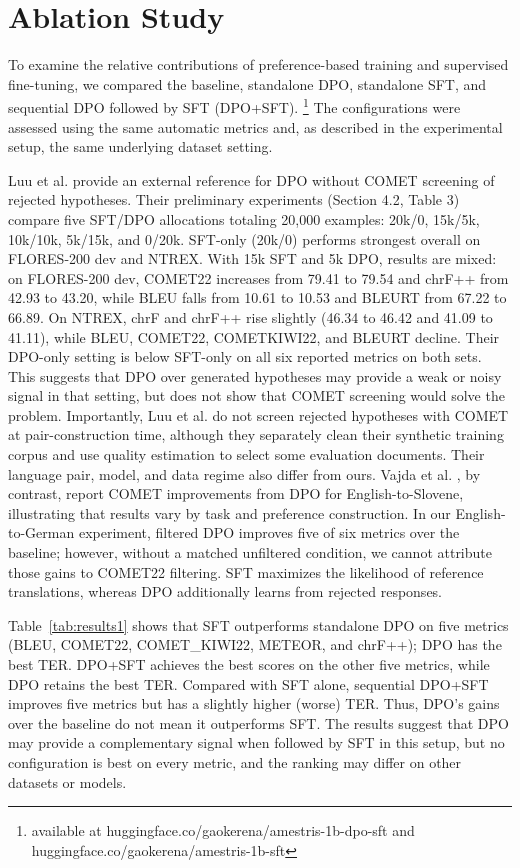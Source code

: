 \documentclass[conference]{IEEEtran}
\begin{document}
\section{Ablation Study}
To examine the relative contributions of preference-based training and supervised fine-tuning, we compared the baseline, standalone DPO, standalone SFT, and sequential DPO followed by SFT (DPO+SFT).
\footnote{available at huggingface.co/gaokerena/amestris-1b-dpo-sft and huggingface.co/gaokerena/amestris-1b-sft}
The configurations were assessed using the same automatic metrics and, as described in the experimental setup, the same underlying dataset setting.

Luu et al. \cite{b5} provide an external reference for DPO without COMET screening of rejected hypotheses. Their preliminary experiments (Section 4.2, Table 3) compare five SFT/DPO allocations totaling 20,000 examples: 20k/0, 15k/5k, 10k/10k, 5k/15k, and 0/20k. SFT-only (20k/0) performs strongest overall on FLORES-200 dev and NTREX. With 15k SFT and 5k DPO, results are mixed: on FLORES-200 dev, COMET22 increases from 79.41 to 79.54 and chrF++ from 42.93 to 43.20, while BLEU falls from 10.61 to 10.53 and BLEURT from 67.22 to 66.89. On NTREX, chrF and chrF++ rise slightly (46.34 to 46.42 and 41.09 to 41.11), while BLEU, COMET22, COMETKIWI22, and BLEURT decline. Their DPO-only setting is below SFT-only on all six reported metrics on both sets. This suggests that DPO over generated hypotheses may provide a weak or noisy signal in that setting, but does not show that COMET screening would solve the problem. Importantly, Luu et al. do not screen rejected hypotheses with COMET at pair-construction time, although they separately clean their synthetic training corpus and use quality estimation to select some evaluation documents. Their language pair, model, and data regime also differ from ours. Vajda et al. \cite{b8}, by contrast, report COMET improvements from DPO for English-to-Slovene, illustrating that results vary by task and preference construction. In our English-to-German experiment, filtered DPO improves five of six metrics over the baseline; however, without a matched unfiltered condition, we cannot attribute those gains to COMET22 filtering. SFT maximizes the likelihood of reference translations, whereas DPO additionally learns from rejected responses.

Table~\ref{tab:results1} shows that SFT outperforms standalone DPO on five metrics (BLEU, COMET22, COMET\_KIWI22, METEOR, and chrF++); DPO has the best TER. DPO+SFT achieves the best scores on the other five metrics, while DPO retains the best TER. Compared with SFT alone, sequential DPO+SFT improves five metrics but has a slightly higher (worse) TER. Thus, DPO's gains over the baseline do not mean it outperforms SFT. The results suggest that DPO may provide a complementary signal when followed by SFT in this setup, but no configuration is best on every metric, and the ranking may differ on other datasets or models.
\end{document}
